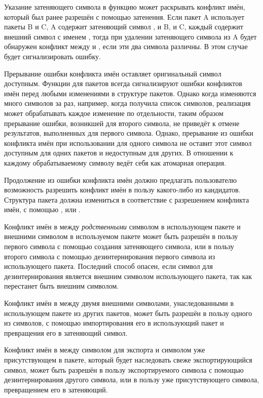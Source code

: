 Указание затеняющего символа в функцию  может раскрывать конфликт
имён, который был ранее разрешён с помощью затенения. Если пакет A использует
пакеты B и C, A содержит затеняющий символ , и B, и C, каждый содержит
внешний символ с именем , тогда при удалении затеняющего символа 
из A будет обнаружен конфликт между  и , если эти два символа
различны.
В этом случае  будет сигнализировать ошибку.

Прерывание ошибки конфликта имён оставляет оригинальный символ доступным.
Функции для пакетов всегда сигнализируют ошибки конфликтов имён перед любыми
изменениями в структуре пакетов. Однако когда изменяются много символов за раз,
например, когда  получила список символов, реализация может
обрабатывать каждое изменение по отдельности, таким образом прерывание ошибки,
возникшей для второго символа, не приведёт к отмене результатов, выполненных для
первого символа. Однако, прерывание из ошибки конфликта имён при использовании
 для одного символа не оставит этот символ доступным для одних
пакетов и недоступным для других. В отношении к каждому обрабатываемому символу
 ведёт себя как атомарная операция.

Продолжение из ошибки конфликта имён должно предлагать пользователю возможность
разрешить конфликт имён в пользу какого-либо из кандидатов. Структура пакета
должна измениться в соответствие с разрешением конфликта имён, с помощью
,  или .

Конфликт имён в  между \emph{родственными} символом в
использующем пакете и внешними символом в используемом пакете может быть
разрешён в пользу первого символа с помощью создания затеняющего символа, или в
пользу второго символа с помощью дезинтернирования первого символа из
использующего пакета. Последний способ опасен, если символ для дезинтернирования
является внешним символом использующего пакета, так как перестанет быть внешним
символом.

Конфликт имён в  между двумя внешними символами,
унаследованными в использующем пакете из других пакетов, может быть разрешён в пользу одного из
символов, с помощью импортирования его в использующий пакет и превращения его в
затеняющий символ.

Конфликт имён в  между символом для экспорта и символом уже
присутствующем в пакете, который будет наследовать свеже экспортирующийся
символ, может быть разрешён в пользу экспортируемого символа с помощью
дезинтернирования другого символа, или в пользу уже присутствующего символа,
превращением его в затеняющий.

